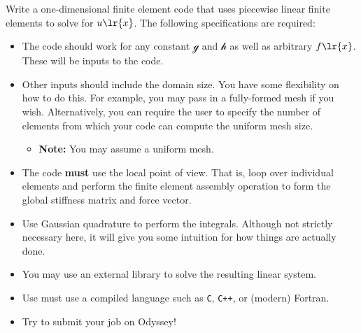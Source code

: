 \documentclass[11pt]{article}
\begin{document}
  Write a one-dimensional finite element code that uses piecewise linear finite elements to solve for $u\lr{x}$.  The
following specifications are required:
  \begin{itemize}
    \item The code should work for any constant $\mathcal{g}$ and $\mathcal{h}$ as well as arbitrary $f\lr{x}$.  These will be inputs to the
code.
    \item Other inputs should include the domain size.  You have some flexibility on how to do this.  For example, you may
pass in a fully-formed mesh if you wish.  Alternatively, you can require the user to specify the number of elements from
which your code can compute the uniform mesh size.
      \begin{itemize}
        \item \textbf{Note:} You may assume a uniform mesh.
      \end{itemize}
    \item The code \textbf{must} use the local point of view.  That is, loop over individual elements and perform the finite
element assembly operation to form the global stiffness matrix and force vector.
    \item Use Gaussian quadrature to perform the integrals.  Although not strictly necessary here, it will give you some
intuition for how things are actually done.
    \item You may use an external library to solve the resulting linear system.
    \item Use must use a compiled language such as \texttt{C}, \texttt{C++}, or (modern) Fortran.
    \item Try to submit your job on Odyssey!
  \end{itemize}
\end{document}
